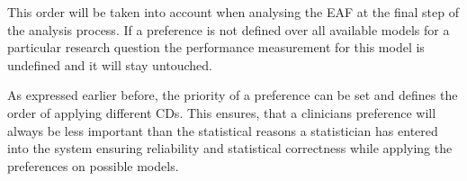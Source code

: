 This order will be taken into account when analysing the \gls{EAF} at the final step of the analysis process. If a preference is not defined over all available models for a particular research question the performance measurement for this model is undefined and it will stay untouched.

As expressed earlier before, the priority of a preference can be set and defines the order of applying different \glspl{CD}. This ensures, that a clinicians preference will always be less important than the statistical reasons a statistician has entered into the system ensuring reliability and statistical correctness while applying the preferences on possible models.

